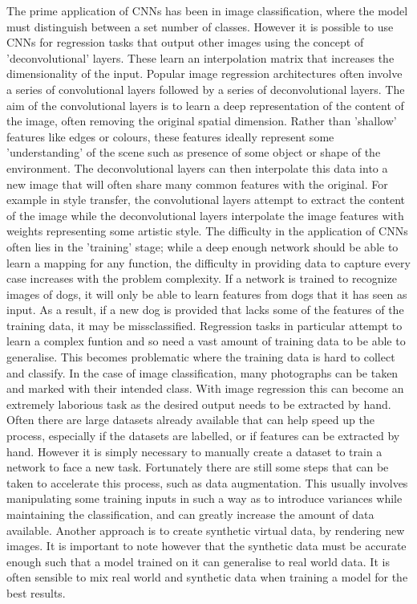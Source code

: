 \documentclass[ %
                    author={Gavin Parker},
                supervisor={Dr. Neill Campbell},
                    degree={MEng},
                     title={Deep Siamese Networks for Illumination Estimation from Stereo Images},
                  subtitle={},
                      type={research},
                      year={2018} ]{dissertation}
\begin{document}
The prime application of CNNs has been in image classification, where the model must distinguish between a set number of classes. However it is possible to use CNNs for regression tasks that output other images using the concept of 'deconvolutional' layers. These learn an interpolation matrix that increases the dimensionality of the input. Popular image regression architectures often involve a series of convolutional layers followed by a series of deconvolutional layers. The aim of the convolutional layers is to learn a deep representation of the content of the image, often removing the original spatial dimension. Rather than 'shallow' features like edges or colours, these features ideally represent some 'understanding' of the scene such as presence of some object or shape of the environment. The deconvolutional layers can then interpolate this data into a new image that will often share many common features with the original. For example in style transfer, the convolutional layers attempt to extract the content of the image while the deconvolutional layers interpolate the image features with weights representing some artistic style.
\newline
The difficulty in the application of CNNs often lies in the 'training' stage; while a deep enough network should be able to learn a mapping for any function, the difficulty in providing data to capture every case increases with the problem complexity. If a network is trained to recognize images of dogs, it will only be able to learn features from dogs that it has seen as input. As a result, if a new dog is provided that lacks some of the features of the training data, it may be missclassified. Regression tasks in particular attempt to learn a complex funtion and so need a vast amount of training data to be able to generalise. This becomes problematic where the training data is hard to collect and classify. In the case of image classification, many photographs can be taken and marked with their intended class. With image regression this can become an extremely laborious task as the desired output needs to be extracted by hand. Often there are large datasets already available that can help speed up the process, especially if the datasets are labelled, or if features can be extracted by hand. However it is simply necessary to manually create a dataset to train a network to face a new task. Fortunately there are still some steps that can be taken to accelerate this process, such as data augmentation. This usually involves manipulating some training inputs in such a way as to introduce variances while maintaining the classification, and can greatly increase the amount of data available. Another approach is to create synthetic virtual data, by rendering new images. It is important to note however that the synthetic data must be accurate enough such that a model trained on it can generalise to real world data. It is often sensible to mix real world and synthetic data when training a model for the best results.
\end{document}
